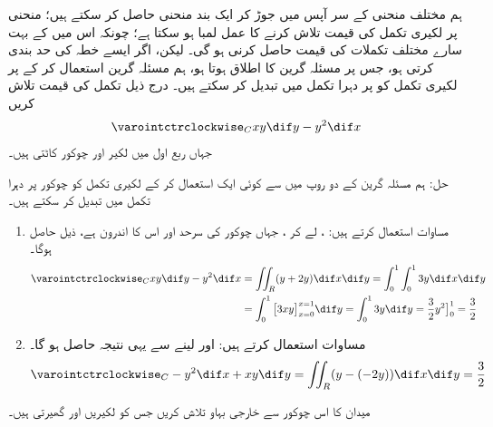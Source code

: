    

ہم مختلف منحنی  کے سر آپس میں جوڑ کر ایک بند منحنی    حاصل کر سکتے ہیں؛ منحنی       پر لکیری تکمل کی قیمت تلاش کرنے کا عمل   لمبا ہو سکتا ہے؛   چونکہ اس میں   کے بہت سارے  مختلف تکملات کی قیمت حاصل کرنی ہو                           گی۔  لیکن،   اگر   ایسے  خطہ   کی حد بندی کرتی ہو، جس پر مسئلہ گرین کا اطلاق ہوتا ہو، ہم مسئلہ گرین استعمال کر کے  پر لکیری تکمل کو   پر   دہرا  تکمل  میں تبدیل کر سکتے ہیں۔    
 درج ذیل تکمل کی قیمت تلاش کریں
\begin{align*}
  \varointctrclockwise_C xy \dif y - y^2 \dif x  
\end{align*}
 جہاں ربع اول میں لکیر  اور  چوکور    کاٹتی  ہیں۔  
 
 

 حل:\quad
 ہم مسئلہ گرین کے  دو    روپ    میں سے کوئی ایک استعمال  کر  کے لکیری تکمل کو چوکور پر  دہرا تکمل میں تبدیل کر سکتے ہیں۔
\begin{enumerate}[1.]
\item
   مساوات    استعمال کرتے  ہیں: ،    لے کر ،  جہاں چوکور کی سرحد     اور اس کا  اندرون      ہے،   ذیل حاصل ہوگا۔ 
\begin{align*}
\varointctrclockwise_C xy \dif y - y^2 \dif x &= \iint_R (y + 2y) \dif x \dif y = \int_0^1 \int_0^1 3y \dif x\dif y \\   
  &= \int_0^1 \big[3xy\big]_{x=0}^{x=1} \dif y = \int_0^1 3y \dif y =\frac{3}{2}y^2\big]_0^1= \frac{3}{2} 
\end{align*}
\item
  مساوات     استعمال کرتے  ہیں:  اور  لینے سے یہی نتیجہ حاصل ہو گا۔ 
\begin{align*}
\varointctrclockwise_C -y^2 \dif x + xy \dif y = \iint_R (y - (-2y)) \dif x \dif y = \frac{3}{2}  
\end{align*}
\end{enumerate}

 میدان  کا اس چوکور سے  خارجی  بہاو تلاش کریں جس کو لکیریں   اور   گھیرتی ہیں۔  

